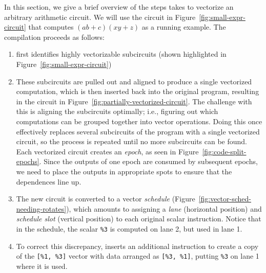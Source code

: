 In this section, we give a brief overview of the steps \system takes to vectorize an arbitrary arithmetic circuit.
We will use the circuit in Figure~\ref{fig:small-expr-circuit} that computes $(ab+c)(xy+z)$ as a running example.
The compilation proceeds as follows:
\begin{enumerate}
    \item \system first identifies highly vectorizable subcircuits (shown highlighted in Figure~\ref{fig:small-expr-circuit})
    \item These subcircuits are pulled out and aligned to produce a single vectorized computation, which is then inserted back into the original program, resulting in the circuit in Figure~\ref{fig:partially-vectorized-circuit}.
    The challenge with this is aligning the subcircuits optimally; i.e., figuring out which computations can be grouped together into vector operations.
    Doing this once effectively replaces several subcircuits of the program with a single vectorized circuit, so the process is repeated until no more subcircuits can be found.
    Each vectorized circuit creates an {\em epoch}, as seen in Figure~\ref{fig:code-split-epochs}.
    Since the outputs of one epoch are consumed by subsequent epochs, we need to place the outputs in appropriate spots to ensure that the dependences line up.
    \item The new circuit is converted to a vector {\em schedule} (Figure~\ref{fig:vector-sched-needing-rotates}), which amounts to assigning a {\em lane} (horizontal position) and {\em schedule slot} (vertical position) to each original scalar instruction.
    Notice that in the schedule, the scalar \texttt{\%3} is computed on lane 2, but used in lane 1. 
    \item To correct this discrepancy, \system inserts an additional instruction to create a copy of the \texttt{[\%1, \%3]} vector with data arranged as \texttt{[\%3, \%1]}, putting \texttt{\%3} on lane 1 where it is used. 
\end{enumerate}

